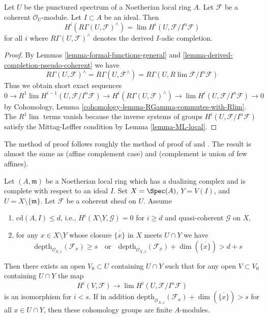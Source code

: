 \begin{lemma}
\label{lemma-compare-with-derived-completion}
Let $U$ be the punctured spectrum of a Noetherian local ring $A$.
Let $\mathcal{F}$ be a coherent $\mathcal{O}_U$-module.
Let $I \subset A$ be an ideal. Then
$$
H^i(R\Gamma(U, \mathcal{F})^\wedge) =
\lim H^i(U, \mathcal{F}/I^n\mathcal{F})
$$
for all $i$ where $R\Gamma(U, \mathcal{F})^\wedge$ denotes
the derived $I$-adic completion.
\end{lemma}

\begin{proof}
By Lemmas \ref{lemma-formal-functions-general} and
\ref{lemma-derived-completion-pseudo-coherent} we have
$$
R\Gamma(U, \mathcal{F})^\wedge =
R\Gamma(U, \mathcal{F}^\wedge) =
R\Gamma(U, R\lim \mathcal{F}/I^n\mathcal{F})
$$
Thus we obtain short exact sequences
$$
0 \to R^1\lim H^{i - 1}(U, \mathcal{F}/I^n\mathcal{F}) \to
H^i(R\Gamma(U, \mathcal{F})^\wedge) \to
\lim H^i(U, \mathcal{F}/I^n\mathcal{F}) \to 0
$$
by Cohomology, Lemma \ref{cohomology-lemma-RGamma-commutes-with-Rlim}.
The $R^1\lim$ terms vanish because the inverse systems of groups
$H^i(U, \mathcal{F}/I^n\mathcal{F})$ satisfy the Mittag-Leffler condition
by Lemma \ref{lemma-ML-local}.
\end{proof}

\begin{theorem}
\label{theorem-algebraization-formal-sections}
\begin{reference}
The method of proof follows roughly the method of
proof of \cite[Theorem 1]{Faltings-algebraisation}
and \cite[Satz 2]{Faltings-uber}.
The result is almost the same as
\cite[Theorem 1.1]{MRaynaud-paper} (affine complement case) and
\cite[Theorem 3.9]{MRaynaud-book} (complement is union of few affines).
\end{reference}
Let $(A, \mathfrak m)$ be a Noetherian local ring which has a
dualizing complex and is complete with respect to an ideal $I$.
Set $X = \Spec(A)$, $Y = V(I)$, and $U = X \setminus \{\mathfrak m\}$.
Let $\mathcal{F}$ be a coherent sheaf on $U$.
Assume
\begin{enumerate}
\item $\text{cd}(A, I) \leq d$, i.e.,
$H^i(X \setminus Y, \mathcal{G}) = 0$ for $i \geq d$ and
quasi-coherent $\mathcal{G}$ on $X$,
\item for any $x \in X \setminus Y$ whose closure $\overline{\{x\}}$
in $X$ meets $U \cap Y$ we have
$$
\text{depth}_{\mathcal{O}_{X, x}}(\mathcal{F}_x) \geq s
\quad\text{or}\quad
\text{depth}_{\mathcal{O}_{X, x}}(\mathcal{F}_x)
+ \dim(\overline{\{x\}}) > d + s
$$
\end{enumerate}
Then there exists an open $V_0 \subset U$ containing $U \cap Y$
such that for any open $V \subset V_0$ containing $U \cap Y$
the map
$$
H^i(V, \mathcal{F}) \to \lim H^i(U, \mathcal{F}/I^n\mathcal{F})
$$
is an isomorphism for $i < s$. If in addition
$
\text{depth}_{\mathcal{O}_{X, x}}(\mathcal{F}_x) +
\dim(\overline{\{x\}}) > s
$
for all $x \in U \cap Y$, then these cohomology groups are finite $A$-modules.
\end{theorem}

